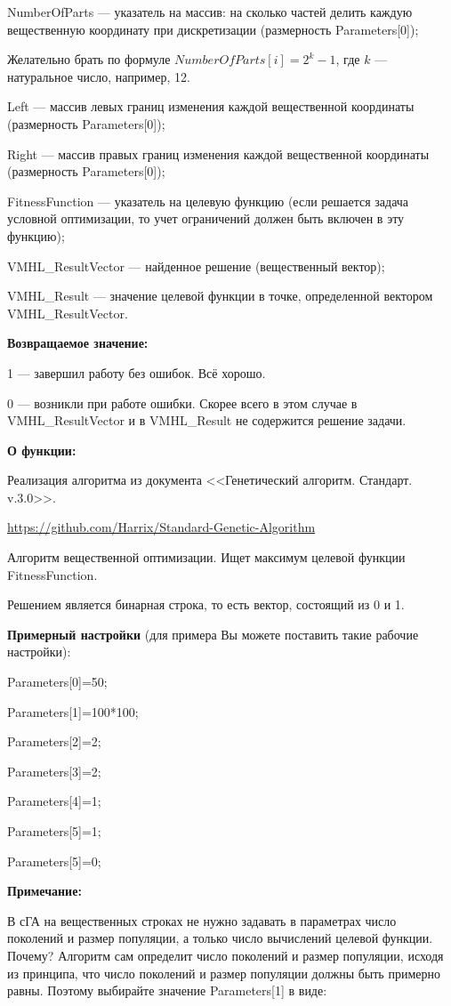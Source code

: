 \documentclass[a4paper,12pt]{article}
\begin{document}
 NumberOfParts --- указатель на массив: на сколько частей делить каждую вещественную координату при дискретизации (размерность Parameters[0]);
 
  Желательно брать по формуле $NumberOfParts[i]=2^k-1$, где $k$ --- натуральное число, например, 12.
  
 Left --- массив левых границ изменения каждой вещественной координаты (размерность Parameters[0]);
 
 Right --- массив правых границ изменения каждой вещественной координаты (размерность Parameters[0]);
 
 FitnessFunction --- указатель на целевую функцию (если решается задача условной оптимизации, то учет ограничений должен быть включен в эту функцию);
 
 VMHL\_ResultVector --- найденное решение (вещественный вектор);
 
 VMHL\_Result --- значение целевой функции в точке, определенной вектором VMHL\_ResultVector.

\textbf{Возвращаемое значение:} 

 1 --- завершил работу без ошибок. Всё хорошо.
 
 0 --- возникли при работе ошибки. Скорее всего в этом случае в VMHL\_ResultVector и в VMHL\_Result не содержится решение задачи.

\textbf{О функции:}

Реализация алгоритма из документа <<Генетический алгоритм. Стандарт. v.3.0>>.

\href{https://github.com/Harrix/Standard-Genetic-Algorithm}{https://github.com/Harrix/Standard-Genetic-Algorithm}

Алгоритм вещественной оптимизации. Ищет максимум целевой функции FitnessFunction.

Решением является бинарная строка, то есть вектор, состоящий из 0 и 1.

\textbf{Примерный настройки} (для примера Вы можете поставить такие рабочие настройки):

 Parameters[0]=50;
 
Parameters[1]=100*100;

Parameters[2]=2;

Parameters[3]=2;

Parameters[4]=1;

Parameters[5]=1;

Parameters[5]=0;


\textbf{Примечание:}

 В сГА на вещественных строках не нужно задавать в параметрах число поколений и размер популяции, а только число вычислений целевой функции. Почему? Алгоритм сам определит число поколений и размер популяции, исходя из принципа, что число поколений и размер популяции должны быть примерно равны. Поэтому выбирайте значение Parameters[1] в виде:
\end{document}
